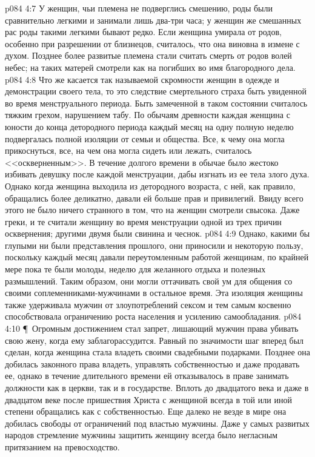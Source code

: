 \vs p084 4:7 У женщин, чьи племена не подверглись смешению, роды были сравнительно легкими и занимали лишь два\hyp{}три часа; у женщин же смешанных рас роды такими легкими бывают редко. Если женщина умирала от родов, особенно при разрешении от близнецов, считалось, что она виновна в измене с духом. Позднее более развитые племена стали считать смерть от родов волей небес; на таких матерей смотрели как на погибших во имя благородного дела.
\vs p084 4:8 Что же касается так называемой скромности женщин в одежде и демонстрации своего тела, то это следствие смертельного страха быть увиденной во время менструального периода. Быть замеченной в таком состоянии считалось тяжким грехом, нарушением табу. По обычаям древности каждая женщина с юности до конца детородного периода каждый месяц на одну полную неделю подвергалась полной изоляции от семьи и общества. Все, к чему она могла прикоснуться, все, на чем она могла сидеть или лежать, считалось <<оскверненным>>. В течение долгого времени в обычае было жестоко избивать девушку после каждой менструации, дабы изгнать из ее тела злого духа. Однако когда женщина выходила из детородного возраста, с ней, как правило, обращались более деликатно, давали ей больше прав и привилегий. Ввиду всего этого не было ничего странного в том, что на женщин смотрели свысока. Даже греки, и те считали женщину во время менструации одной из трех причин осквернения; другими двумя были свинина и чеснок.
\vs p084 4:9 Однако, какими бы глупыми ни были представления прошлого, они приносили и некоторую пользу, поскольку каждый месяц давали переутомленным работой женщинам, по крайней мере пока те были молоды, неделю для желанного отдыха и полезных размышлений. Таким образом, они могли оттачивать свой ум для общения со своими соплеменниками\hyp{}мужчинами в остальное время. Эта изоляция женщины также удерживала мужчин от злоупотреблений сексом и тем самым косвенно способствовала ограничению роста населения и усилению самообладания.
\vs p084 4:10 \P\ Огромным достижением стал запрет, лишающий мужчин права убивать свою жену, когда ему заблагорассудится. Равный по значимости шаг вперед был сделан, когда женщина стала владеть своими свадебными подарками. Позднее она добилась законного права владеть, управлять собственностью и даже продавать ее, однако в течение длительного времени ей отказывалось в праве занимать должности как в церкви, так и в государстве. Вплоть до двадцатого века и даже в двадцатом веке после пришествия Христа с женщиной всегда в той или иной степени обращались как с собственностью. Еще далеко не везде в мире она добилась свободы от ограничений под властью мужчины. Даже у самых развитых народов стремление мужчины защитить женщину всегда было негласным притязанием на превосходство.
